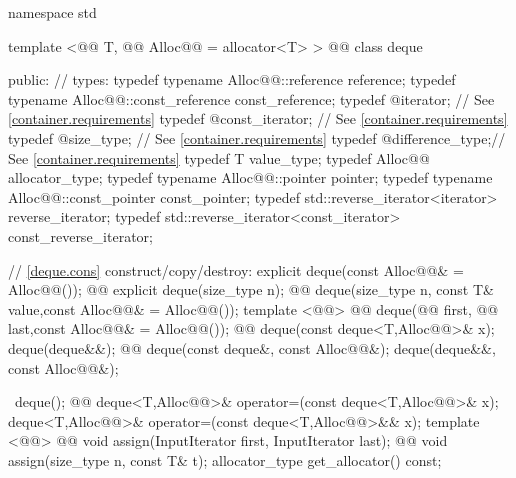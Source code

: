 \documentclass[american,twoside]{book}
\begin{document}
\begin{codeblock}
namespace std {
  template <@@ T, @@ Alloc@@ = allocator<T> >
  @@
  class deque {
  public:
    // types:
    typedef typename Alloc@@::reference         reference;
    typedef typename Alloc@@::const_reference   const_reference;
    typedef @\impdef@                iterator;       // See \ref{container.requirements}
    typedef @\impdef@                const_iterator; // See \ref{container.requirements}
    typedef @\impdef@                size_type;      // See \ref{container.requirements}
    typedef @\impdef@                difference_type;// See \ref{container.requirements}
    typedef T                                     value_type;
    typedef Alloc@@                             allocator_type;
    typedef typename Alloc@@::pointer           pointer;
    typedef typename Alloc@@::const_pointer     const_pointer;
    typedef std::reverse_iterator<iterator>       reverse_iterator;
    typedef std::reverse_iterator<const_iterator> const_reverse_iterator;

    // \ref{deque.cons} construct/copy/destroy:
    explicit deque(const Alloc@@& = Alloc@@());
    @@ explicit deque(size_type n);
    @@ 
      deque(size_type n, const T& value,const Alloc@@& = Alloc@@());
    template <@@>
      @@ 
      deque(@@ first, @@ last,const Alloc@@& = Alloc@@());
    @@ deque(const deque<T,Alloc@@>& x);
    deque(deque&&);
    @@ deque(const deque&, const Alloc@@&);
    deque(deque&&, const Alloc@@&);

   ~deque();
    @@
      deque<T,Alloc@@>& operator=(const deque<T,Alloc@@>& x);
    deque<T,Alloc@@>& operator=(const deque<T,Alloc@@>&& x);
    template <@@>
      @@
      void assign(InputIterator first, InputIterator last);
    @@ 
      void assign(size_type n, const T& t);
    allocator_type get_allocator() const;

}}
\end{codeblock}
\end{document}
